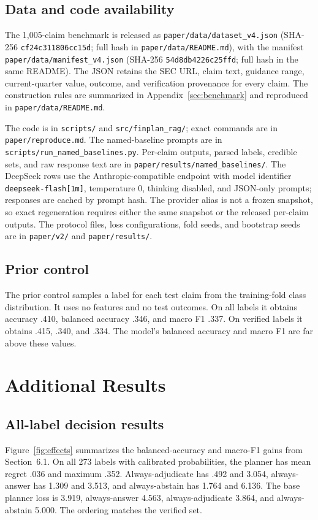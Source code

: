 \documentclass[11pt]{article}
\begin{document}
\subsection{Data and code availability}
\label{app:availability}
The 1,005-claim benchmark is released as
\texttt{paper/data/dataset\_v4.json} (SHA-256
\texttt{cf24c311806cc15d}; full hash in \texttt{paper/data/README.md}),
with the manifest \texttt{paper/data/manifest\_v4.json} (SHA-256
\texttt{54d8db4226c25ffd}; full hash in the same README).
The JSON retains the SEC URL, claim text, guidance range, current-quarter
value, outcome, and verification provenance for every claim. The construction
rules are summarized in Appendix~\ref{sec:benchmark} and reproduced in
\texttt{paper/data/README.md}.

The code is in \texttt{scripts/} and \texttt{src/finplan\_rag/}; exact
commands are in \texttt{paper/reproduce.md}. The named-baseline prompts are in
\texttt{scripts/run\_named\_baselines.py}. Per-claim outputs, parsed labels,
credible sets, and raw response text are in
\texttt{paper/results/named\_baselines/}. The DeepSeek rows use the
Anthropic-compatible endpoint with model identifier
\texttt{deepseek-flash[1m]}, temperature 0, thinking disabled, and JSON-only
prompts; responses are cached by prompt hash. The provider alias is not a
frozen snapshot, so exact regeneration requires either the same snapshot or the
released per-claim outputs. The protocol files, loss configurations, fold
seeds, and bootstrap seeds are in \texttt{paper/v2/} and
\texttt{paper/results/}.

\subsection{Prior control}
The prior control samples a label for each test claim from the training-fold class distribution. It uses no features and no test outcomes. On all labels it obtains accuracy .410, balanced accuracy .346, and macro F1 .337. On verified labels it obtains .415, .340, and .334. The model's balanced accuracy and macro F1 are far above these values.

\section{Additional Results}
\label{app:additional}

\subsection{All-label decision results}
Figure~\ref{fig:effects} summarizes the balanced-accuracy and macro-F1 gains from Section~6.1. On all 273 labels with calibrated probabilities, the planner has mean regret .036 and maximum .352. Always-adjudicate has .492 and 3.054, always-answer has 1.309 and 3.513, and always-abstain has 1.764 and 6.136. The base planner loss is 3.919, always-answer 4.563, always-adjudicate 3.864, and always-abstain 5.000. The ordering matches the verified set.
\end{document}
